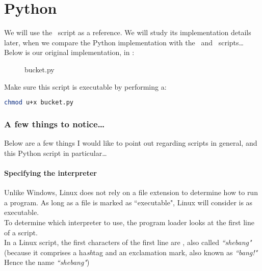 
\renewcommand{\currentPart}{Python}

\newpage
\part{Python} \label{python}

We will use the \python\ script as a reference. We will study its implementation details later, when we compare the Python implementation with the \awk\ and \perl\ scripts\dots \\


Below is our original implementation, in \python:

\begin{figure}[h]
	\caption{bucket.py}
	
\end{figure}  


\newpage


Make sure this script is executable by performing a:
\begin{lstlisting}[language=sh]
chmod u+x bucket.py
\end{lstlisting}



\section*{A few things to notice\dots}

Below are a few things I would like to point out regarding scripts in general, and this Python script in particular\dots


\subsection*{Specifying the interpreter}

Unlike Windows, Linux does not rely on a file extension to determine how to run a program. As long as a file is marked as ``executable", Linux will consider is as executable. \\

To determine which interpreter to use, the program loader looks at the first line of a script. \\

In a Linux script, the first characters of the first line are \cmd{\#!}, also called \emph{``shebang"} (because it comprises a ha\emph{sh}tag and an exclamation mark, also known as \emph{``bang!"} Hence the name \emph{``shebang"}) \\


